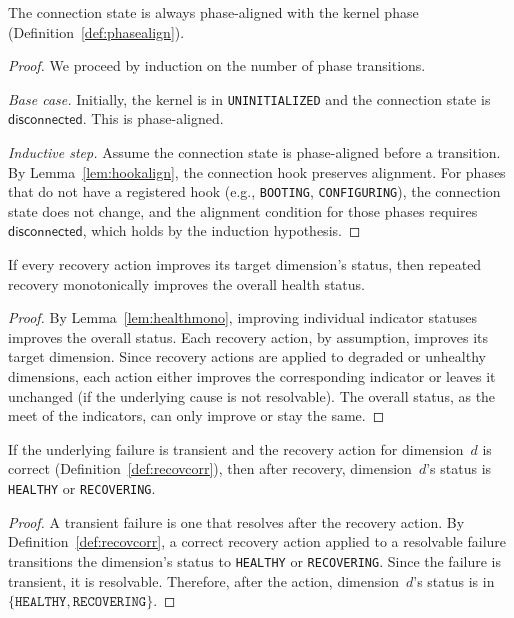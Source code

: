 \documentclass[11pt]{article}
\begin{document}
\begin{theorem}\label{thm:lifealign}
The connection state is always phase-aligned with the kernel
phase (Definition~\ref{def:phasealign}).
\end{theorem}
\begin{proof}
We proceed by induction on the number of phase transitions.

\emph{Base case.}  Initially, the kernel is in
\texttt{UNINITIALIZED} and the connection state is
$\mathsf{disconnected}$.  This is phase-aligned.

\emph{Inductive step.}  Assume the connection state is
phase-aligned before a transition.  By Lemma~\ref{lem:hookalign},
the connection hook preserves alignment.  For phases that do
not have a registered hook (e.g., \texttt{BOOTING},
\texttt{CONFIGURING}), the connection state does not change,
and the alignment condition for those phases requires
$\mathsf{disconnected}$, which holds by the induction hypothesis.
\end{proof}

\begin{theorem}\label{thm:healthmono}
If every recovery action improves its target dimension's
status, then repeated recovery monotonically improves the
overall health status.
\end{theorem}
\begin{proof}
By Lemma~\ref{lem:healthmono}, improving individual
indicator statuses improves the overall status.  Each
recovery action, by assumption, improves its target
dimension.  Since recovery actions are applied to degraded
or unhealthy dimensions, each action either improves the
corresponding indicator or leaves it unchanged (if the
underlying cause is not resolvable).  The overall status,
as the meet of the indicators, can only improve or stay
the same.
\end{proof}

\begin{theorem}\label{thm:recovcorr}
If the underlying failure is transient and the recovery
action for dimension~$d$ is correct
(Definition~\ref{def:recovcorr}), then after recovery,
dimension~$d$'s status is \texttt{HEALTHY} or
\texttt{RECOVERING}.
\end{theorem}
\begin{proof}
A transient failure is one that resolves after the
recovery action.  By Definition~\ref{def:recovcorr},
a correct recovery action applied to a resolvable failure
transitions the dimension's status to \texttt{HEALTHY} or
\texttt{RECOVERING}.  Since the failure is transient,
it is resolvable.  Therefore, after the action,
dimension~$d$'s status is in
$\{\texttt{HEALTHY}, \texttt{RECOVERING}\}$.
\end{proof}
\end{document}
